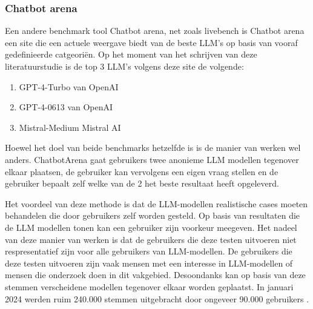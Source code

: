         \subsubsection{Chatbot arena} 
        
        Een andere benchmark tool Chatbot arena, net zoals livebench is Chatbot arena een site die een actuele weergave biedt van de beste LLM's op basis van vooraf gedefinieerde catgeoriën. Op het moment van het schrijven van deze literatuurstudie is de top 3 LLM's volgens deze site de volgende:
        
        \begin{enumerate}
            \item GPT-4-Turbo van OpenAI
            \item GPT-4-0613 van OpenAI
            \item Mistral-Medium Mistral AI
        \end{enumerate}
        
        Hoewel het doel van beide benchmarks hetzelfde is is de manier van werken wel anders. ChatbotArena gaat gebruikers twee anonieme LLM modellen tegenover elkaar plaatsen, de gebruiker kan vervolgens een eigen vraag stellen en de gebruiker bepaalt zelf welke van de 2 het beste resultaat heeft opgeleverd.
        
        Het voordeel van deze methode is dat de LLM-modellen realistische cases moeten behandelen die door gebruikers zelf worden gesteld. Op basis van resultaten die de LLM modellen tonen kan een gebruiker zijn voorkeur meegeven. Het nadeel van deze manier van werken is dat de gebruikers die deze testen uitvoeren niet respresentatief zijn voor alle gebruikers van LLM-modellen. De gebruikers die deze testen uitvoeren zijn vaak mensen met een interesse in LLM-modellen of mensen die onderzoek doen in dit vakgebied. Desoondanks kan op basis van deze stemmen verscheidene modellen tegenover elkaar worden geplaatst. In januari 2024 werden ruim 240.000 stemmen uitgebracht door ongeveer 90.000 gebruikers \autocite{chiang2024chatbot}. 
        
        
